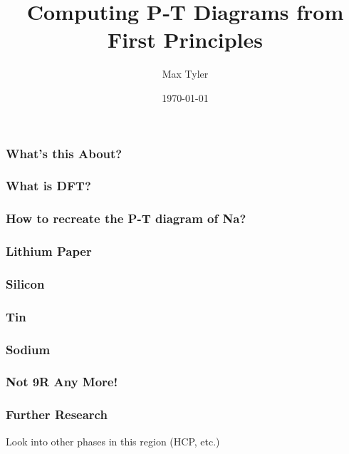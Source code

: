 \documentclass{beamer}
\title{Computing P‐T Diagrams from First Principles}
\author{Max Tyler}
\institute{The University of Edinburgh}
\date{\today}
\begin{document}
 
\frame{\titlepage}
 
\begin{frame}
	\frametitle{What's this About?}
\end{frame}

\begin{frame}
	\frametitle{What is DFT?}
\end{frame}

\begin{frame}
	\frametitle{How to recreate the P-T diagram of Na?}
\end{frame}

\begin{frame}
	\frametitle{Lithium Paper}
\end{frame}
 
\begin{frame}
	\frametitle{Silicon}
\end{frame}

\begin{frame}
	\frametitle{Tin}
\end{frame}

\begin{frame}
	\frametitle{Sodium}
\end{frame}

\begin{frame}
	\frametitle{Not 9R Any More!}
\end{frame}

\begin{frame}
	\frametitle{Further Research}
	Look into other phases in this region (HCP, etc.)
\end{frame}
\end{document}

